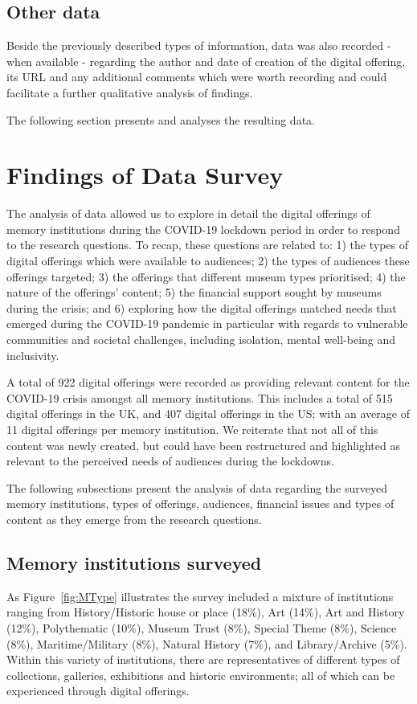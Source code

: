 \documentclass{egpubl}
\begin{document}
\subsection{Other data}
\label{other}

Beside the previously described types of information, data was also recorded - when available - regarding the author and date of creation of the digital offering, its URL and any additional comments which were worth recording and could facilitate a further qualitative analysis of findings.


The following section presents and analyses the resulting data. 
 

\section{Findings of Data Survey}
\label{find}
The analysis of data allowed us to explore in detail the digital offerings of memory institutions during the COVID-19 lockdown period in order to respond to the research questions. To recap, these questions are related to: 1) the types of digital offerings which were available to audiences; 2) the types of audiences these offerings targeted; 3) the offerings that different museum types prioritised; 4) the nature of the offerings' content; 5) the financial support sought by museums during the crisis; and 6) exploring how the digital offerings matched needs that emerged during the COVID-19 pandemic in particular with regards to vulnerable communities and societal challenges, including isolation, mental well-being and inclusivity. 

A total of 922 digital offerings were recorded as providing relevant content for the COVID-19 crisis amongst all memory institutions. This includes a total of 515 digital offerings in the UK, and 407 digital offerings in the US; with an average of 11 digital offerings per memory institution. We reiterate that not all of this content was newly created, but could have been restructured and highlighted as relevant to the perceived needs of audiences during the lockdowns. 

The following subsections present the analysis of data regarding the surveyed memory institutions, types of offerings, audiences, financial issues and types of content as they emerge from the research questions.

\subsection{Memory institutions surveyed}
\label{inst}
As Figure~\ref{fig:MType} illustrates the survey included a mixture of institutions ranging from History/Historic house or place (18\%), Art (14\%), Art and History (12\%), Polythematic (10\%), Museum Trust (8\%), Special Theme (8\%), Science (8\%), Maritime/Military (8\%), Natural History (7\%), and Library/Archive (5\%). Within this variety of institutions, there are representatives of different types of collections, galleries, exhibitions and historic environments; all of which can be experienced through digital offerings. 
\end{document}

